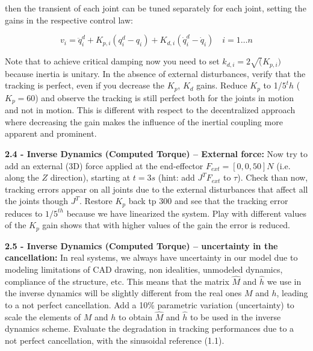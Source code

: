 \documentclass[11pt]{article}
\begin{document}
then the transient of each joint can be tuned separately for each joint, setting the gains in the respective  control law:

\begin{equation*}
v_i  = \ddot{q}^d_i + K_{p,i} (q^d_i  - q_i) + K_{d,i} (\dot{q}^d_i  - \dot{q}_i) \quad i = 1 \dots n
\end{equation*}

Note that to achieve critical damping now you need to set $k_{d,i} = 2\sqrt(K_{p,i})$ because inertia is unitary.
In the absence of external disturbances, verify that the tracking is perfect, 
even if you decrease the $K_p$, $K_d$ gains.  Reduce $K_p$ to 1/$5^th$ ($K_p = 60$) and observe the tracking is still perfect both for the joints in motion and not in motion. This is different with respect to the decentralized approach where decreasing the gain makes the influence of the inertial coupling more apparent and prominent.   

\quad

\noindent
\textbf{2.4 - Inverse Dynamics (Computed Torque) – External force:} 
Now try to add an external (3D) force applied at the end-effector $F_{ext} =[0,0,50] N$ (i.e. along the $Z$ direction),
starting at $t= 3s$ (hint: add  $J^TF_{ext}$ to $\tau$). Check than now, tracking errors appear on all joints due to the external disturbances that affect all the joints though  $J^T$.
Restore $K_p$ back tp $300$ and see that the tracking error reduces to $1/5^{th}$ because we have linearized the system. 
Play with different values of the  $K_p$ gain shows that with higher values of the gain the error is reduced.

\quad

\noindent
\textbf{2.5 - Inverse Dynamics (Computed Torque) – uncertainty in the cancellation:}
%
In real systems, we always have uncertainty in our model due to modeling 
limitations of  CAD  drawing, non idealities, unmodeled dynamics, compliance of the structure, etc.
This means that the matrix $\hat{M}$ and $\hat{h}$ we use in the inverse dynamics will be slightly different from the real ones ${M}$ and ${h}$, leading to a not perfect cancellation. Add a 10\%   parametric variation (uncertainty) to scale the elements of $M$ and $h$  to obtain $\hat{M}$ and $\hat{h}$  to be used in the inverse dynamics scheme. %
Evaluate the degradation in tracking performances due to a not perfect cancellation, with the sinusoidal reference (1.1).
\end{document}
